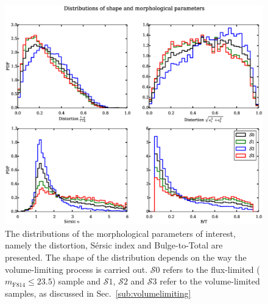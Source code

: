 \documentclass[twocolumn,useAMS,usenatbib]{mn2e}
\newcommand{\rachel}[1]{{\textcolor{red}{#1}}}
\newcommand{\sersic}{S\'{e}rsic }
\newcommand{\btt}{Bulge-to-Total }
\newcommand{\s}{\ensuremath{\mathcal{S}}}
\begin{document}
% 
\begin{figure}
 \centering
 \includegraphics[width=2.2\columnwidth]{sample_histograms}
 \caption{The distributions of the morphological parameters of interest, namely the distortion, \sersic index and \btt are presented. 
          The shape of the distribution depends on the way the volume-limiting process is carried out. \s$0$ refers to the flux-limited ($m_\text{F814}\le23.5$) sample
          and \s$1$, \s$2$ and \s$3$ refer to the volume-limited samples, as discussed in Sec.~\ref{sub:volumelimiting}}
  \label{fig:sample_histograms}
\end{figure}
\end{document}
